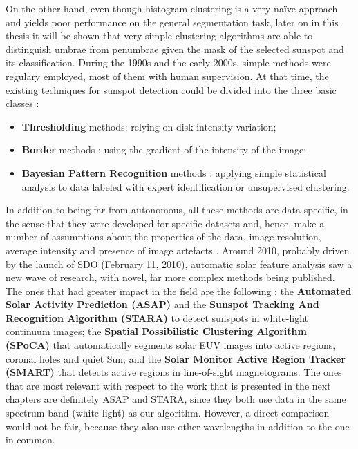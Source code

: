 \bigbreak
\noindent On the other hand, even though histogram clustering is a very na\"{i}ve approach and yields poor performance on the general segmentation task, later on in this thesis it will be shown that very simple clustering algorithms are able to distinguish umbrae from penumbrae given the mask of the selected sunspot and its classification.
\bigbreak
\noindent During the 1990s and the early 2000s, simple methods were regulary employed, most of them with human supervision. At that time, the existing techniques for sunspot detection could be divided into the three basic classes \cite{zharkov2004}:
\begin{itemize}
  \item \textbf{Thresholding} methods: relying on disk intensity variation;
  \item \textbf{Border} methods \cite{pettauer1997novel}: using the gradient of the intensity of the image;
  \item \textbf{Bayesian Pattern Recognition} methods \cite{turmon2002statistical}: applying simple statistical analysis to data labeled with expert identification or unsupervised clustering.
\end{itemize}
\bigbreak
\noindent In addition to being far from autonomous, all these methods are data specific, in the sense that they were developed for specific datasets and, hence, make a number of assumptions about the properties of the data, image resolution, average intensity and presence of image artefacts \cite{zharkov2004}.
\bigbreak
\noindent Around 2010, probably driven by the launch of SDO (February 11, 2010), automatic solar feature analysis saw a new wave of research, with novel, far more complex methods being published. The ones that had greater impact in the field are the following \cite{verbeeck2013multi}: the \textbf{Automated Solar Activity Prediction (ASAP)} and the \textbf{Sunspot Tracking And Recognition Algorithm (STARA)} \cite{watson2009modelling} to detect sunspots in white-light continuum images; the \textbf{Spatial Possibilistic Clustering Algorithm (SPoCA)}  \cite{barra2009fast} that automatically segments solar EUV images into active regions, coronal holes and quiet Sun; and the \textbf{Solar Monitor Active Region Tracker (SMART)} \cite{higgins2011solar} that detects active regions in line-of-sight magnetograms. The ones that are most relevant with respect to the work that is presented in the next chapters are definitely ASAP and STARA, since they both use data in the same spectrum band (white-light) as our algorithm. However, a direct comparison would not be fair, because they also use other wavelengths in addition to the one in common.
